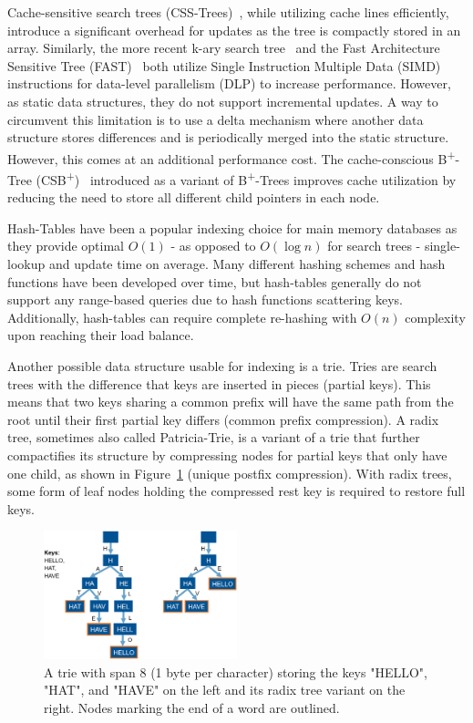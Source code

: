\documentclass[acmtog, nonacm]{acmart}
\begin{document}
Cache-sensitive search trees (CSS-Trees)~\cite{rao1998cache}, while utilizing cache lines efficiently, 
introduce a significant overhead for updates as the tree is compactly stored in an array. 
Similarly, the more recent k-ary search tree~\cite{10.1145/1565694.1565705} and the Fast Architecture 
Sensitive Tree (FAST)~\cite{10.1145/1807167.1807206} both utilize Single Instruction Multiple Data (SIMD) 
instructions for data-level parallelism (DLP) to increase performance. However, as static data 
structures, they do not support incremental updates. A way to circumvent this limitation is to 
use a delta mechanism where another data structure stores differences and is periodically merged 
into the static structure. However, this comes at an additional performance cost. The cache-conscious 
B\textsuperscript{+}-Tree (CSB\textsuperscript{+})~\cite{10.1145/342009.335449} introduced as a variant of 
B\textsuperscript{+}-Trees improves cache utilization by reducing the need to store all different 
child pointers in each node.

Hash-Tables have been a popular indexing choice for main memory databases as they provide 
optimal $O(1)$ - as opposed to $O(\log n)$ for search trees - single-lookup and update 
time on average. Many different hashing schemes and hash functions have been developed 
over time, but hash-tables generally do not support any range-based queries due to hash functions scattering keys. Additionally, hash-tables can require complete re-hashing with $O(n)$ complexity 
upon reaching their load balance.

Another possible data structure usable for indexing is a trie. Tries are search trees 
with the difference that keys are inserted in pieces (partial keys). This means that two keys sharing a common
prefix will have the same path from the root until their first partial key differs (common prefix compression). A radix tree, 
sometimes also called Patricia-Trie, is a variant of
a trie that further compactifies its structure by compressing nodes for partial keys that only have one child, as 
shown in Figure~\ref{fig:trie} (unique postfix compression). With radix trees, some form of leaf nodes holding the compressed rest key is required 
to restore full keys.

\begin{figure}
    \centering
    \includegraphics[width=0.5\textwidth]{images/01-trie-radix-tree-example.PNG}
    \caption{A trie with span 8 (1 byte per character) storing the keys "HELLO", "HAT", and "HAVE" on the left and its radix tree variant on the right. Nodes marking the end of a word are outlined.}
    \label{fig:trie}
\end{figure}
\end{document}

